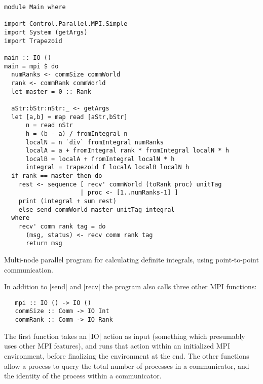 \documentclass{tmr}
\newcommand{\Todo}[1]{{\textbf{Todo: #1}}}
\begin{document}
\begin{listing}
\begin{Verbatim}
module Main where

import Control.Parallel.MPI.Simple
import System (getArgs)
import Trapezoid

main :: IO ()
main = mpi $ do
  numRanks <- commSize commWorld
  rank <- commRank commWorld
  let master = 0 :: Rank

  aStr:bStr:nStr:_ <- getArgs
  let [a,b] = map read [aStr,bStr]
      n = read nStr
      h = (b - a) / fromIntegral n
      localN = n `div` fromIntegral numRanks
      localA = a + fromIntegral rank * fromIntegral localN * h
      localB = localA + fromIntegral localN * h
      integral = trapezoid f localA localB localN h
  if rank == master then do
    rest <- sequence [ recv' commWorld (toRank proc) unitTag
                     | proc <- [1..numRanks-1] ]
    print (integral + sum rest)
    else send commWorld master unitTag integral
  where
    recv' comm rank tag = do
      (msg, status) <- recv comm rank tag
      return msg
\end{Verbatim}
\caption{Multi-node parallel program for calculating definite
  integrals, using point-to-point communication. \label{mpi-p2p}}
\end{listing}

In addition to |send| and |recv| the program also calls three other MPI functions:
\begin{Verbatim}
   mpi :: IO () -> IO ()
   commSize :: Comm -> IO Int
   commRank :: Comm -> IO Rank
\end{Verbatim}
The first function takes an |IO| action as input (something which presumably
uses other MPI features), and runs that action within an initialized MPI
environment, before finalizing the environment at the end. The other
functions allow a process to query the total number of processes in a
communicator, and the identity of the process within a communicator.

\end{document}
